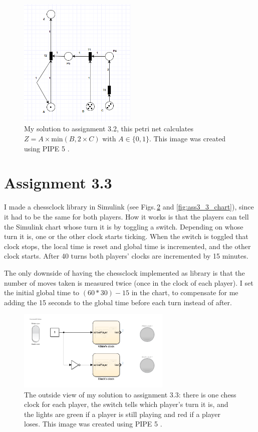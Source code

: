 \documentclass{article}
\begin{document}
	\begin{figure}
		\centering
		\includegraphics[width=0.5\textwidth]{Ass3_2}
		\caption{My solution to assignment 3.2, this petri net calculates $Z = A \times \textrm{min}(B, 2\times C)$ with $A \in \{0,1\}$. This image was created using PIPE 5 \cite{dingle2009pipe2, bonet2007pipe}. \label{fig:ass3_2}}
	\end{figure}
	
	
	\section{Assignment 3.3}
	\par I made a chessclock library in Simulink (see Figs.\,\ref{fig:ass3_3_env} and \ref{fig:ass3_3_chart}), since it had to be the same for both players. How it works is that the players can tell the Simulink chart whose turn it is by toggling a switch. Depending on whose turn it is, one or the other clock starts ticking. When the switch is toggled that clock stops, the local time is reset and global time is incremented, and the other clock starts. After 40 turns both players' clocks are incremented by 15 minutes.
	\par The only downside of having the chessclock implemented as library is that the number of moves taken is measured twice (once in the clock of each player). I set the initial global time to $(60*30) - 15$ in the chart, to compensate for me adding the 15 seconds to the global time before each turn instead of after.
	
	\begin{figure}
		\centering
		\includegraphics[width=0.65\textwidth]{Ass3_3_environment}
		\caption{The outside view of my solution to assignment 3.3: there is one chess clock for each player, the switch tells which player's turn it is, and the lights are green if a player is still playing and red if a player loses.
		This image was created using PIPE 5 \cite{dingle2009pipe2, bonet2007pipe}. \label{fig:ass3_3_env}}
	\end{figure}
\end{document}

